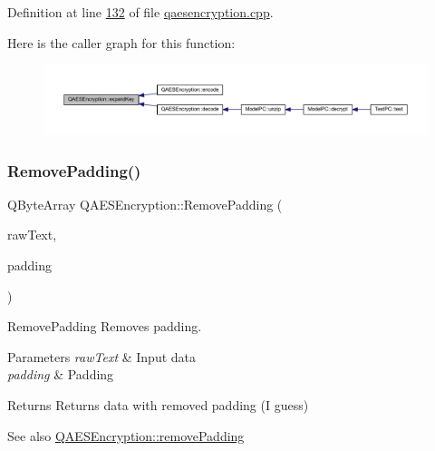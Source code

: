 Definition at line \mbox{\hyperlink{qaesencryption_8cpp_source_l00132}{132}} of file \mbox{\hyperlink{qaesencryption_8cpp_source}{qaesencryption.\+cpp}}.

Here is the caller graph for this function\+:
\nopagebreak
\begin{figure}[H]
\begin{center}
\leavevmode
\includegraphics[width=350pt]{class_q_a_e_s_encryption_a5bfbb972f84a8376fceed648553c0912_icgraph}
\end{center}
\end{figure}
\mbox{\label{class_q_a_e_s_encryption_abb2887bf5623a74053dd19627f3d3055}} 
\subsubsection{\texorpdfstring{Remove\+Padding()}{RemovePadding()}}
{\footnotesize\ttfamily Q\+Byte\+Array Q\+A\+E\+S\+Encryption\+::\+Remove\+Padding (\begin{DoxyParamCaption}\item[{const Q\+Byte\+Array \&}]{raw\+Text,  }\item[{\mbox{\hyperlink{class_q_a_e_s_encryption_ab0a65cdea4eac21ef32530010d1b0247}{Q\+A\+E\+S\+Encryption\+::\+Padding}}}]{padding }\end{DoxyParamCaption})\hspace{0.3cm}{\ttfamily [static]}}



Remove\+Padding Removes padding. 


\begin{DoxyParams}{Parameters}
{\em raw\+Text} & Input data \\
\hline
{\em padding} & Padding \\
\hline
\end{DoxyParams}
\begin{DoxyReturn}{Returns}
Returns data with removed padding (I guess) 
\end{DoxyReturn}
\begin{DoxySeeAlso}{See also}
\mbox{\hyperlink{class_q_a_e_s_encryption_a4dc7e77485e5a3e63eebc99b9386c17b}{Q\+A\+E\+S\+Encryption\+::remove\+Padding}} 
\end{DoxySeeAlso}


